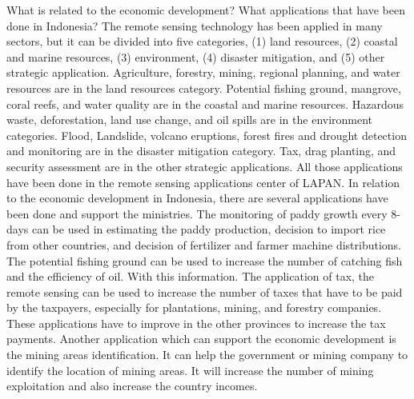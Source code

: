 {{What is related to the economic development? What applications that have been done in Indonesia? The remote sensing technology has been applied in many sectors, but it can be divided into five categories, (1) land resources, (2) coastal and marine resources, (3) environment, (4) disaster mitigation, and (5) other strategic application.  Agriculture, forestry, mining, regional planning, and water resources are in the land resources category. Potential fishing ground, mangrove, coral reefs, and water quality are in the coastal and marine resources. Hazardous waste, deforestation, land use change, and oil spills are in the environment categories. Flood, Landslide, volcano eruptions, forest fires and drought detection and monitoring are in the disaster mitigation category. Tax, drag planting, and security assessment are in the other strategic applications. All those applications have been done in the remote sensing applications center of LAPAN.  In relation to the economic development in Indonesia, there are several applications have been done and support the ministries. The monitoring of paddy growth every 8-days can be used in estimating the paddy production, decision to import rice from other countries, and decision of fertilizer and farmer machine distributions. The potential fishing ground can be used to increase the number of catching fish and the efficiency of oil. With this information. The application of tax, the remote sensing can be used to increase the number of taxes that have to be paid by the taxpayers, especially for plantations, mining, and forestry companies. These applications have to improve in the other provinces to increase the tax payments. Another application which can support the economic development is the mining areas identification. It can help the government or mining company to identify the location of mining areas. It will increase the number of mining exploitation and also increase the country incomes. 
}}
